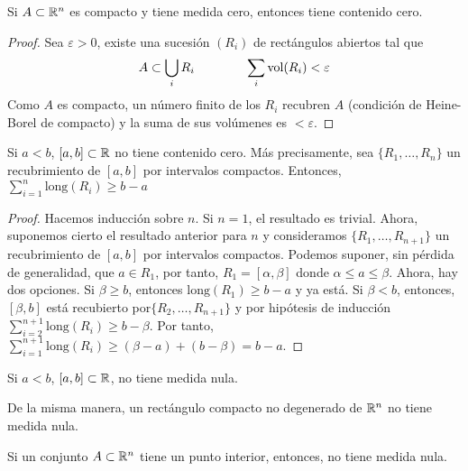\begin{prop}
    Si $A \subset \mathbb{R}^n$ es compacto y tiene medida cero, entonces tiene contenido
    cero.
\end{prop}
\begin{proof}
    Sea $\varepsilon > 0$, existe una sucesión $(R_i)$ de rectángulos abiertos tal
    que
    \[
        A \subset \bigcup_i R_i \qquad \qquad \sum_i \operatorname{vol}(R_i) < \varepsilon
    \]
    Como $A$ es compacto, un número finito de los $R_i$ recubren $A$ (condición
    de Heine-Borel de compacto) y la suma de sus volúmenes es $< \varepsilon$.
\end{proof}

\begin{lema}
    Si $a < b$, $[a,b] \subset \mathbb{R}$ no tiene contenido cero. Más precisamente,
    sea $\{R_1,\dots,R_n\}$ un recubrimiento de $[a,b]$ por intervalos compactos.
    Entonces, $\sum\limits^{n}_{i=1} \text{long}(R_i) \geq b-a$
\end{lema}
\begin{proof}
    Hacemos inducción sobre $n$. Si $n = 1$, el resultado es trivial. Ahora,
    suponemos cierto el resultado anterior para $n$ y consideramos
    $\{R_1,\dots,R_{n+1}\}$ un recubrimiento de $[a,b]$ por intervalos compactos.
    Podemos suponer, sin p\'erdida de generalidad, que $a \in R_1$, por tanto,
    $R_1 = [\alpha,\beta]$ donde $\alpha \leq a \leq \beta$. Ahora, hay dos
    opciones. Si $\beta \geq b$, entonces $\text{long}(R_1) \geq b - a$ y ya está.
    Si $\beta< b$, entonces, $[\beta,b]$ está recubierto por$\{R_2,\dots,R_{n+1}\}$
    y por hipótesis de inducción $\sum\limits^{n+1}_{i=2} \text{long}(R_i) \geq
    b - \beta$. Por tanto, $\sum\limits^{n+1}_{i=1} \text{long}(R_i) \geq
    (\beta - a) + (b - \beta) = b - a$.
\end{proof}
\begin{col*}
    Si $a < b$, $[a,b]\subset \mathbb{R}$, no tiene medida nula.
\end{col*}
\begin{obs*}
    De la misma manera, un rectángulo compacto no degenerado de $\mathbb{R}^n$ no
    tiene medida nula.
\end{obs*}
\begin{col*}
    Si un conjunto $A \subset \mathbb{R}^n$ tiene un punto interior, entonces, no tiene
    medida nula.
\end{col*}


